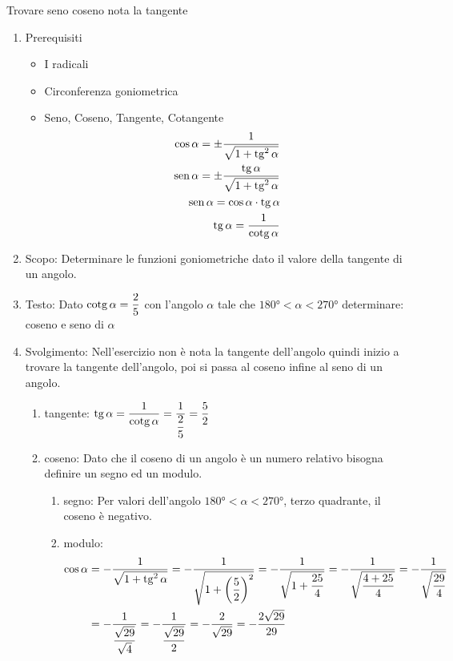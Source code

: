 \begin{table}[H]
	\caption{Trovare seno coseno nota la tangente}
	\label{tab:sommadifangoli}
	\begin{enumerate}
		\item Prerequisiti 
		\begin{itemize}
			\item I radicali
			\item Circonferenza goniometrica
			\item Seno, Coseno, Tangente, Cotangente
			\begin {align*}
			\cos\alpha=\pm\dfrac{1}{\sqrt{1+\operatorname{tg}^2\alpha}}\\
			\operatorname{sen}\alpha=\pm\dfrac{\operatorname{tg}\alpha}{\sqrt{1+\operatorname{tg}^2\alpha}}\\
			\operatorname{sen}\alpha=\cos\alpha\cdot\operatorname{tg}\alpha\\
			\operatorname{tg}\alpha=\dfrac{1}{\operatorname{cotg}\alpha}
		\end{align*}
	\end{itemize}
	\item Scopo: Determinare le funzioni goniometriche dato il valore della tangente di un angolo.
	\item Testo: Dato $\operatorname{cotg}\alpha=\dfrac{2}{5}$ con l'angolo $\alpha$ tale che $\ang{180}<\alpha<\ang{270}$ determinare: coseno e seno di $\alpha$
	\item Svolgimento: Nell'esercizio non è nota la tangente dell'angolo quindi inizio a trovare la tangente dell'angolo, poi si passa al coseno infine al seno di un angolo.
	\begin{enumerate}
		\item tangente: $\operatorname{tg}\alpha=\dfrac{1}{\operatorname{cotg}\alpha}=\dfrac{1}{\dfrac{2}{5}}=\dfrac{5}{2}$
		\item coseno: Dato che il coseno di un angolo è un numero relativo bisogna definire un segno ed un modulo.
		\begin{enumerate}
			\item segno: Per valori dell'angolo  $\ang{180}<\alpha<\ang{270}$, terzo quadrante, il coseno è negativo. 
			\item modulo:
			\begin{align*}
			\cos\alpha&=-\dfrac{1}{\sqrt{1+\operatorname{tg}^2\alpha}}
			=-\dfrac{1}{\sqrt{1+\left(\dfrac{5}{2}\right)^2}}=-\dfrac{1}{\sqrt{1+\dfrac{25}{4}}}
			=-\dfrac{1}{\sqrt{\dfrac{4+25}{4}}}=-\dfrac{1}{\sqrt{\dfrac{29}{4}}}\\
			&=-\dfrac{1}{\dfrac{\sqrt{29}}{\sqrt{4}}}=-\dfrac{1}{\dfrac{\sqrt{29}}{2}}=-\dfrac{2}{\sqrt{29}}=-\dfrac{2\sqrt{29}}{29}
			\end{align*}

\end{enumerate}
\end{enumerate}
\end{enumerate}
\end{table}

